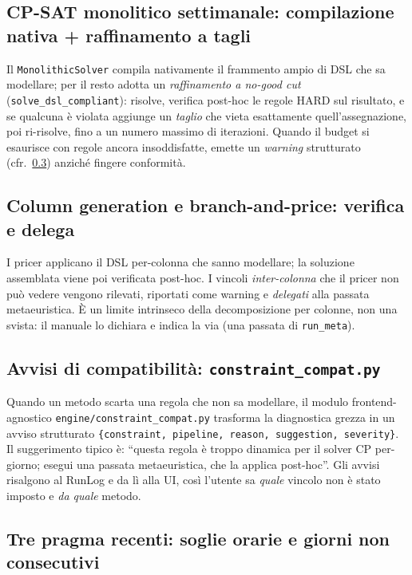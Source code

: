 \subsection{CP-SAT monolitico settimanale: compilazione nativa + raffinamento a tagli}
\label{sec:dsl-nogood}

Il \texttt{MonolithicSolver} compila nativamente il frammento ampio di DSL
che sa modellare; per il resto adotta un \emph{raffinamento a no-good cut}
(\texttt{solve\_dsl\_compliant}): risolve, verifica post-hoc le regole HARD
sul risultato, e se qualcuna \`e violata aggiunge un \emph{taglio} che vieta
esattamente quell'assegnazione, poi ri-risolve, fino a un numero massimo di
iterazioni. Quando il budget si esaurisce con regole ancora insoddisfatte,
emette un \emph{warning} strutturato (cfr.\ \cref{sec:dsl-constraint-compat})
anzich\'e fingere conformit\`a.

\subsection{Column generation e branch-and-price: verifica e delega}
\label{sec:dsl-cg-delega}

I pricer applicano il DSL per-colonna che sanno modellare; la soluzione
assemblata viene poi verificata post-hoc. I vincoli \emph{inter-colonna}
che il pricer non pu\`o vedere vengono rilevati, riportati come warning e
\emph{delegati} alla passata metaeuristica. \`E un limite intrinseco della
decomposizione per colonne, non una svista: il manuale lo dichiara e indica
la via (una passata di \texttt{run\_meta}).

\subsection{Avvisi di compatibilit\`a: \texttt{constraint\_compat.py}}
\label{sec:dsl-constraint-compat}

Quando un metodo scarta una regola che non sa modellare, il modulo
frontend-agnostico \texttt{engine/constraint\_compat.py} trasforma la
diagnostica grezza in un avviso strutturato
\texttt{\{constraint, pipeline, reason, suggestion, severity\}}. Il
suggerimento tipico \`e: ``questa regola \`e troppo dinamica per il solver
CP per-giorno; esegui una passata metaeuristica, che la applica post-hoc''.
Gli avvisi risalgono al RunLog e da l\`i alla UI, cos\`i l'utente sa
\emph{quale} vincolo non \`e stato imposto e \emph{da quale} metodo.

\subsection{Tre pragma recenti: soglie orarie e giorni non consecutivi}
\label{sec:dsl-pragma-nuovi}

